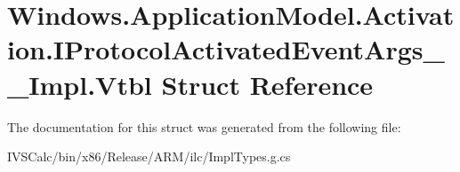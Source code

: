 \hypertarget{struct_windows_1_1_application_model_1_1_activation_1_1_i_protocol_activated_event_args_____impl_1_1_vtbl}{}\section{Windows.\+Application\+Model.\+Activation.\+I\+Protocol\+Activated\+Event\+Args\+\_\+\+\_\+\+Impl.\+Vtbl Struct Reference}
\label{struct_windows_1_1_application_model_1_1_activation_1_1_i_protocol_activated_event_args_____impl_1_1_vtbl}


The documentation for this struct was generated from the following file\+:\begin{DoxyCompactItemize}
\item 
I\+V\+S\+Calc/bin/x86/\+Release/\+A\+R\+M/ilc/Impl\+Types.\+g.\+cs\end{DoxyCompactItemize}

